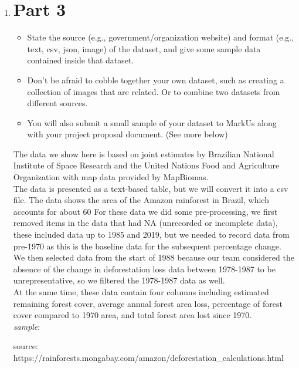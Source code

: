 \documentclass[12pt]{article}
\begin{document}
\begin{enumerate}
\newpage

\item \section*{Part 3}

\begin{itemize}
    \item State the source (e.g., government/organization website) and format (e.g., text, csv, json, image) of the dataset, and give some sample data contained inside that dataset.
    \item Don’t be afraid to cobble together your own dataset, such as creating a collection of images that are related. Or to combine two datasets from different sources.
    \item You will also submit a small sample of your dataset to MarkUs along with your project proposal document. (See more below)
\end{itemize}


The data we show here is based on joint estimates by Brazilian National Institute of Space Research and the United Nations Food and Agriculture Organization with map data provided by MapBiomas.\\
    The data is presented as a text-based table, but we will convert it into a csv file. The data shows the area of the Amazon rainforest in Brazil, which accounts for about 60%
    For these data we did some pre-processing, we first removed items in the data that had NA (unrecorded or incomplete data), these included data up to 1985 and 2019, but we needed to record data from pre-1970 as this is the baseline data for the subsequent percentage change.\\
    We then selected data from the start of 1988 because our team considered the absence of the change in deforestation loss data between 1978-1987 to be unrepresentative, so we filtered the 1978-1987 data as well.\\
    At the same time, these data contain four columns including estimated remaining forest cover, average annual forest area loss, percentage of forest cover compared to 1970 area, and total forest area lost since 1970.\\
    

    \emph{sample}: 
    
    source: https://rainforests.mongabay.com/amazon/deforestation\_calculations.html




\end{enumerate}
\end{document}
